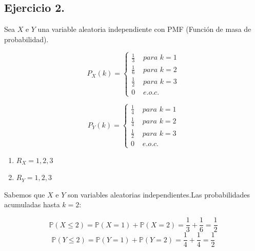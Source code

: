\documentclass[10pt,a4paper]{book}
\begin{document}
\newpage

\subsection{Ejercicio 2.}Sea $X$ e $Y$ una variable aleatoria independiente con PMF (Función de masa de probabilidad).

\[
P_X(k)=
\begin{cases}
\frac{1}{3} & \textit{ para } k=1 \\
\frac{1}{6} & \textit{ para } k=2 \\
\frac{1}{2} & \textit{ para } k=3 \\
 0 & \textit{ e.o.c. } 
\end{cases}
\]

\[
P_Y(k)=
\begin{cases}
\frac{1}{4} & \textit{ para } k=1 \\
\frac{1}{4} & \textit{ para } k=2 \\
\frac{1}{2} & \textit{ para } k=3 \\
 0 & \textit{ e.o.c. } 
\end{cases}
\]


\begin{enumerate}
    \item \(R_{X}={1,2,3}\)
    \item \(R_{Y}={1,2,3}\)
\end{enumerate}


\vspace{0.2cm}

Sabemos que $X$ e $Y$ son variables aleatorias independientes.Las probabilidades acumuladas hasta $k=2$:

\[ \mathbb{P}(X \le 2) = \mathbb{P}(X=1) + \mathbb{P}(X=2) = \frac{1}{3} + \frac{1}{6} = \frac{1}{2} \]
\[ \mathbb{P}(Y \le 2) = \mathbb{P}(Y=1) + \mathbb{P}(Y=2) = \frac{1}{4} + \frac{1}{4} = \frac{1}{2} \]
\end{document}
